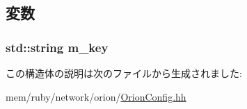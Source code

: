 \subsection{変数}
\hypertarget{structOrionConfig_1_1key__not__found_acc7e2a331a9a946e407c9b63ee0c7275}{
\subsubsection[{m\_\-key}]{\setlength{\rightskip}{0pt plus 5cm}std::string {\bf m\_\-key}}}
\label{structOrionConfig_1_1key__not__found_acc7e2a331a9a946e407c9b63ee0c7275}


この構造体の説明は次のファイルから生成されました:\begin{DoxyCompactItemize}
\item 
mem/ruby/network/orion/\hyperlink{OrionConfig_8hh}{OrionConfig.hh}\end{DoxyCompactItemize}
